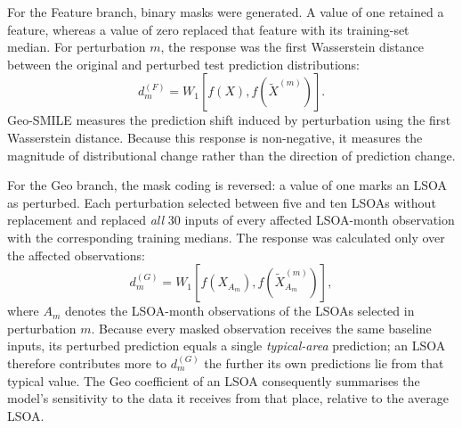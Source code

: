 For the Feature branch, binary masks were generated. A value of one retained a feature, whereas a value of zero replaced that feature with its training-set median. For perturbation $m$, the response was the first Wasserstein distance between the original and perturbed test prediction distributions:
\begin{equation}
d_m^{(F)} =
W_1\left[
f(X),
f\left(\widetilde{X}^{(m)}\right)
\right].
\label{eq:hull_feature_response}
\end{equation}
Geo-SMILE measures the prediction shift induced by perturbation using the first Wasserstein distance. Because this response is non-negative, it measures the magnitude of distributional change rather than the direction of prediction change.

For the Geo branch, the mask coding is reversed: a value of one marks an LSOA as perturbed. Each perturbation selected between five and ten LSOAs without replacement and replaced \emph{all} 30 inputs of every affected LSOA-month observation with the corresponding training medians. The response was calculated only over the affected observations:
\begin{equation}
d_m^{(G)} =
W_1\left[
f(X_{A_m}),
f\left(\widetilde{X}^{(m)}_{A_m}\right)
\right],
\label{eq:hull_geo_response}
\end{equation}
where $A_m$ denotes the LSOA-month observations of the LSOAs selected in perturbation $m$. Because every masked observation receives the same baseline inputs, its perturbed prediction equals a single \emph{typical-area} prediction; an LSOA therefore contributes more to $d_m^{(G)}$ the further its own predictions lie from that typical value. The Geo coefficient of an LSOA consequently summarises the model's sensitivity to the data it receives from that place, relative to the average LSOA.

